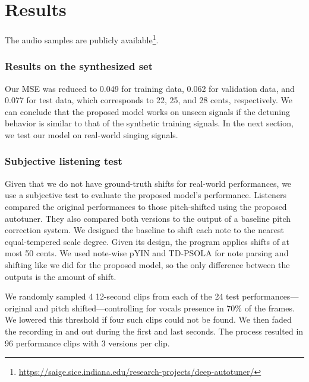 \chapter{Results}
The audio samples are publicly available\footnote{\href{https://saige.sice.indiana.edu/research-projects/deep-autotuner/}{https://saige.sice.indiana.edu/research-projects/deep-autotuner/}}.
\subsection{Results on the synthesized set}
Our MSE was reduced to 0.049 for training data, 0.062 for validation data, and 0.077 for test data, which corresponds to 22, 25, and 28 cents, respectively. We can conclude that the proposed model works on unseen signals if the detuning behavior is similar to that of the synthetic training signals. In the next section, we test our model on real-world singing signals.

\subsection{Subjective listening test}
\label{sec:subjective-test}
Given that we do not have ground-truth shifts for real-world performances, we use a subjective test to evaluate the proposed model's performance. Listeners compared the original performances to those pitch-shifted using the proposed autotuner. They also compared both versions to the output of a baseline pitch correction system. We designed the baseline to shift each note to the nearest equal-tempered scale degree. Given its design, the program applies shifts of at most 50 cents. We used note-wise pYIN and TD-PSOLA for note parsing and shifting like we did for the proposed model, so the only difference between the outputs is the amount of shift.

We randomly sampled 4 12-second clips from each of the 24 test performances---original and pitch shifted---controlling for vocals presence in 70\% of the frames. We lowered this threshold if four such clips could not be found. We then faded the recording in and out during the first and last seconds. The process resulted in 96 performance clips with 3 versions per clip. 

